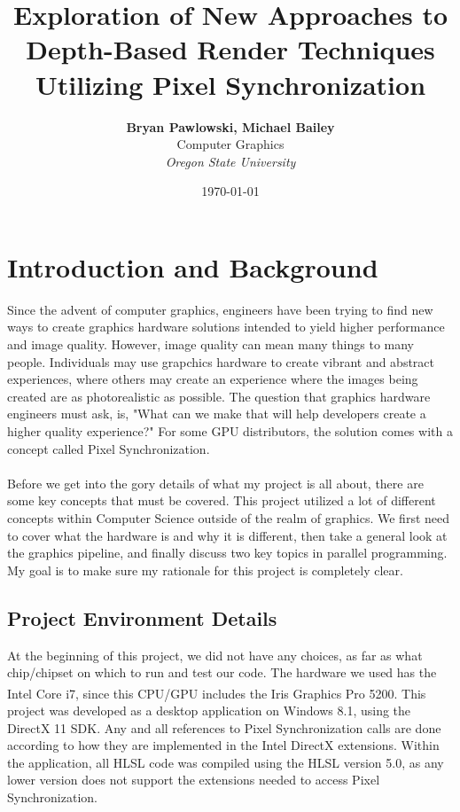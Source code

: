 \documentclass[a4paper, 12pt]{article}
\title{\textbf{Exploration of New Approaches to Depth-Based Render Techniques Utilizing Pixel Synchronization}}
\date{\today}
\author{\textbf{Bryan Pawlowski, Michael Bailey} \\ Computer Graphics \\ \textit{Oregon State University}}
\begin{document}
\begin{titlepage}
\maketitle
\thispagestyle{empty}
\end{titlepage}

\tableofcontents
\pagebreak


\section{Introduction and Background} 

Since the advent of computer graphics, engineers have been trying to find new
ways to create graphics hardware solutions intended to yield higher
performance and image quality. However, image quality can mean many things to
many people. Individuals may use grapchics hardware to create vibrant and
abstract experiences, where others may create an experience where the images
being created are as photorealistic as possible. The question that graphics
hardware engineers must ask, is, "What can we make that will help developers
create a higher quality experience?" For some GPU distributors, the solution
comes with a concept called Pixel Synchronization. \\ \\ Before we get into
the gory details of what my project is all about, there are some key concepts
that must be covered. This project utilized a lot of different concepts within
Computer Science outside of the realm of graphics. We first need to cover what
the hardware is and why it is different, then take a general look at the
graphics pipeline, and finally discuss two key topics in parallel programming.
My goal is to make sure my rationale for this project is completely clear.

\subsection{Project Environment Details}
\label{hardware}

At the beginning of this project, we did not have any choices, as far as what
chip/chipset on which to run and test our code. The hardware we used has the
Intel\textsuperscript{\textregistered} Core i7, since this CPU/GPU includes
the Iris\textsuperscript{\texttrademark} Graphics Pro 5200. This project was
developed as a desktop application on Windows 8.1, using the DirectX 11 SDK.
Any and all references to Pixel Synchronization calls are done according to
how they are implemented in the Intel DirectX extensions. Within the
application, all HLSL code was compiled using the HLSL version 5.0, as any
lower version does not support the extensions needed to access Pixel
Synchronization.
\end{document}
